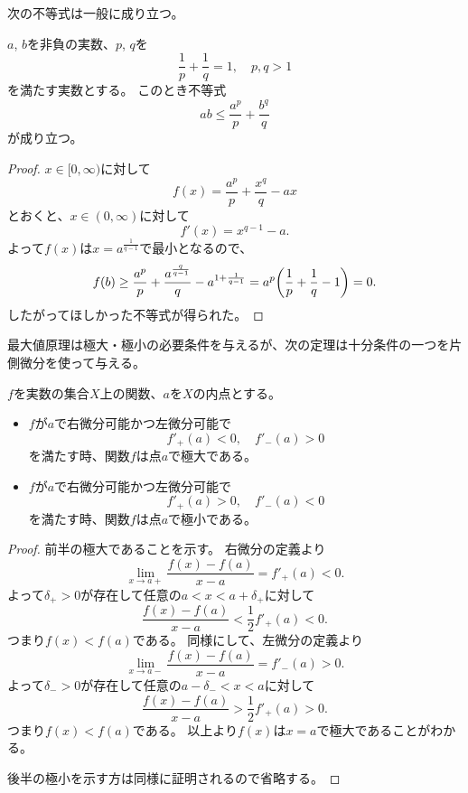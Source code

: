 次の不等式は一般に成り立つ。

\begin{theorem}[ヤングの不等式]
\label{t_young_ineq}
$a$, $b$を非負の実数、$p$, $q$を
\begin{equation}
\label{e_holder_conj}
\frac{1}{p}+\frac{1}{q} = 1, \quad p, q > 1
\end{equation}
を満たす実数とする。
このとき不等式
$$
a b \le \frac{a^p}{p}+\frac{b^q}{q}
$$
が成り立つ。
\end{theorem}

\begin{proof}
$x \in [0, \infty)$に対して
$$
f(x) = \frac{a^p}{p}+\frac{x^q}{q}-a x
$$
とおくと、$x \in (0, \infty)$に対して
$$
f'(x) = x^{q-1}-a.
$$
よって$f(x)$は$x = a^{\frac{1}{q-1}}$で最小となるので、
$$
f(b) \ge \frac{a^p}{p}+\frac{a^{\frac{q}{q-1}}}{q}-a^{1+\frac{1}{q-1}} = a^p\qty(\frac{1}{p}+\frac{1}{q}-1) = 0.
$$
したがってほしかった不等式が得られた。
\end{proof}

最大値原理は極大・極小の必要条件を与えるが、次の定理は十分条件の一つを片側微分を使って与える。

\begin{theorem}
$f$を実数の集合$X$上の関数、$a$を$X$の内点とする。
\begin{itemize}
\item
$f$が$a$で右微分可能かつ左微分可能で
$$
f'_+(a) < 0,
\quad f'_-(a) > 0
$$
を満たす時、関数$f$は点$a$で極大である。
\item
$f$が$a$で右微分可能かつ左微分可能で
$$
f'_+(a) > 0,
\quad f'_-(a) < 0
$$
を満たす時、関数$f$は点$a$で極小である。
\end{itemize}
\end{theorem}

\begin{proof}
前半の極大であることを示す。
右微分の定義より
$$
\lim_{x \to a+}\frac{f(x)-f(a)}{x-a} = f'_+(a) < 0.
$$
よって$\delta_+ > 0$が存在して任意の$a < x < a+\delta_+$に対して
$$
\frac{f(x)-f(a)}{x-a} < \frac{1}{2}f'_+(a) < 0.
$$
つまり$f(x) < f(a)$である。
同様にして、左微分の定義より
$$
\lim_{x \to a-}\frac{f(x)-f(a)}{x-a} = f'_-(a) > 0.
$$
よって$\delta_- > 0$が存在して任意の$a-\delta_- < x < a$に対して
$$
\frac{f(x)-f(a)}{x-a} > \frac{1}{2}f'_+(a) > 0.
$$
つまり$f(x) < f(a)$である。
以上より$f(x)$は$x = a$で極大であることがわかる。

後半の極小を示す方は同様に証明されるので省略する。
\end{proof}

